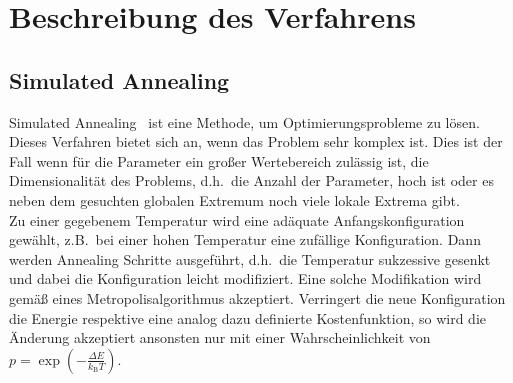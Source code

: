 \chapter{Beschreibung des Verfahrens}

\section{Simulated Annealing}
Simulated Annealing~\parencite{nr} ist eine Methode, um Optimierungsprobleme zu lösen. Dieses Verfahren bietet sich an, wenn das Problem sehr komplex ist. Dies ist der Fall wenn für die Parameter ein großer Wertebereich zulässig ist, die Dimensionalität des Problems, d.h.\ die Anzahl der Parameter, hoch ist oder es neben dem gesuchten globalen Extremum noch viele lokale Extrema gibt. \\
Zu einer gegebenem Temperatur wird eine adäquate Anfangskonfiguration gewählt, z.B.\ bei einer hohen Temperatur eine zufällige Konfiguration. Dann werden Annealing Schritte ausgeführt, d.h.\ die Temperatur sukzessive gesenkt und dabei die Konfiguration leicht modifiziert. Eine solche Modifikation wird gemäß eines Metropolisalgorithmus akzeptiert. Verringert die neue Konfiguration die Energie respektive eine analog dazu definierte Kostenfunktion, so wird die Änderung akzeptiert ansonsten nur mit einer Wahrscheinlichkeit von $p=\exp\left(-\frac{\Delta E}{k_\mathrm{B}T}\right)$.

